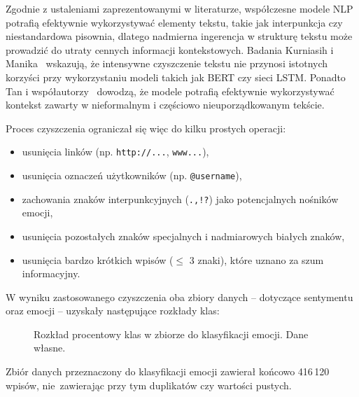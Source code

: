 Zgodnie z ustaleniami zaprezentowanymi w literaturze, współczesne modele NLP potrafią efektywnie wykorzystywać elementy tekstu, takie jak interpunkcja czy niestandardowa pisownia, dlatego nadmierna ingerencja w strukturę tekstu może prowadzić do utraty cennych informacji kontekstowych. Badania Kurniasih i Manika~\cite{PreprocessingKurniasih} wskazują, że intensywne czyszczenie tekstu nie przynosi istotnych korzyści przy wykorzystaniu modeli takich jak BERT czy sieci LSTM. Ponadto Tan i współautorzy~\cite{PreprocessingTan} dowodzą, że modele potrafią efektywnie wykorzystywać kontekst zawarty w nieformalnym i częściowo nieuporządkowanym tekście.

\vspace{5pt}

Proces czyszczenia ograniczał się więc do kilku prostych operacji:
\begin{itemize}
    \item usunięcia linków (np. \texttt{http://...}, \texttt{www...}),
    \item usunięcia oznaczeń użytkowników (np. \texttt{@username}),
    \item zachowania znaków interpunkcyjnych (\texttt{.,!?}) jako potencjalnych nośników emocji,
    \item usunięcia pozostałych znaków specjalnych i nadmiarowych białych znaków,
    \item usunięcia bardzo krótkich wpisów ($\leq$ 3 znaki), które uznano za szum informacyjny.
\end{itemize}

W wyniku zastosowanego czyszczenia oba zbiory danych -- dotyczące sentymentu oraz emocji -- uzyskały następujące rozkłady klas:

\begin{figure}[H]
    \centering
    \caption{Rozkład procentowy klas w zbiorze do klasyfikacji emocji. Dane własne.}
    \label{fig:emotion-distribution}
\end{figure}

Zbiór danych przeznaczony do klasyfikacji emocji zawierał końcowo 416\,120 wpisów, nie~zawierając przy tym duplikatów czy wartości pustych.

